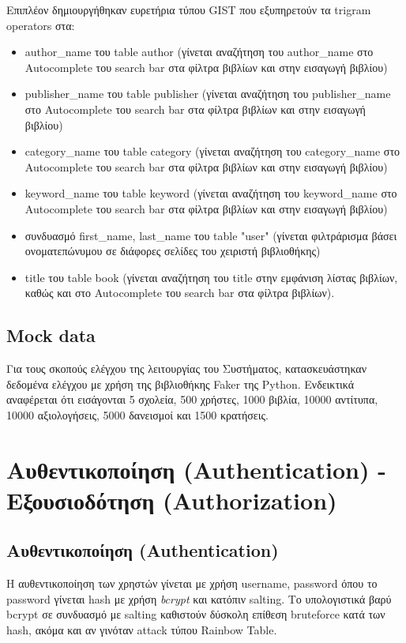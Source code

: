 \documentclass[a4paper]{article}
\begin{document}
\par Επιπλέον δημιουργήθηκαν ευρετήρια τύπου GIST που εξυπηρετούν τα trigram operators στα:
\begin{itemize}
    \item author\_name του table author (γίνεται αναζήτηση του author\_name στο Autocomplete του search bar στα φίλτρα βιβλίων και στην εισαγωγή βιβλίου)
    \item publisher\_name του table publisher (γίνεται αναζήτηση του publisher\_name στο Autocomplete του search bar στα φίλτρα βιβλίων και στην εισαγωγή βιβλίου)
    \item category\_name του table category (γίνεται αναζήτηση του category\_name στο Autocomplete του search bar στα φίλτρα βιβλίων και στην εισαγωγή βιβλίου)
    \item keyword\_name του table keyword (γίνεται αναζήτηση του keyword\_name στο Autocomplete του search bar στα φίλτρα βιβλίων και στην εισαγωγή βιβλίου)
    \item συνδυασμό first\_name, last\_name του table "user" (γίνεται φιλτράρισμα βάσει ονοματεπώνυμου σε διάφορες σελίδες του χειριστή βιβλιοθήκης)
    \item title του table book (γίνεται αναζήτηση του title στην εμφάνιση λίστας βιβλίων, καθώς και στο Autocomplete του search bar στα φίλτρα βιβλίων).
\end{itemize}

\subsection{Mock data}
\label{mock_data}
\par Για τους σκοπούς ελέγχου της λειτουργίας του Συστήματος, κατασκευάστηκαν δεδομένα ελέγχου με χρήση της βιβλιοθήκης Faker της Python. Ενδεικτικά αναφέρεται ότι εισάγονται 5 σχολεία, 500 χρήστες, 1000 βιβλία, 10000 αντίτυπα, 10000 αξιολογήσεις, 5000 δανεισμοί και 1500 κρατήσεις.

\section{Αυθεντικοποίηση (Authentication) - Εξουσιοδότηση (Authorization)}

\subsection{Αυθεντικοποίηση (Authentication)}

\par Η αυθεντικοποίηση των χρηστών γίνεται με χρήση username, password όπου το password γίνεται hash με χρήση \textit{bcrypt} και κατόπιν salting. Το υπολογιστικά βαρύ bcrypt σε συνδυασμό με salting καθιστούν δύσκολη επίθεση bruteforce κατά των hash, ακόμα και αν γινόταν attack τύπου Rainbow Table.
\end{document}
